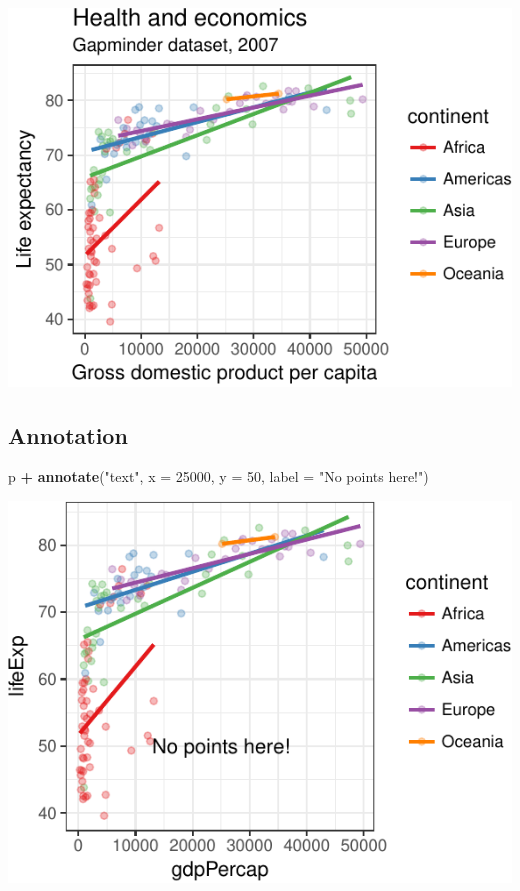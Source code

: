 \documentclass[12pt,]{krantz}
\makeatletter
\newenvironment{Shaded}{\begin{snugshade}}{\end{snugshade}}
\newcommand{\DataTypeTok}[1]{\textcolor[rgb]{0.13,0.29,0.53}{#1}}
\newcommand{\DecValTok}[1]{\textcolor[rgb]{0.00,0.00,0.81}{#1}}
\newcommand{\KeywordTok}[1]{\textcolor[rgb]{0.13,0.29,0.53}{\textbf{#1}}}
\newcommand{\NormalTok}[1]{#1}
\newcommand{\OperatorTok}[1]{\textcolor[rgb]{0.81,0.36,0.00}{\textbf{#1}}}
\newcommand{\StringTok}[1]{\textcolor[rgb]{0.31,0.60,0.02}{#1}}
\newenvironment{kframe}{%
\medskip{}
\setlength{\fboxsep}{.8em}
 \def\at@end@of@kframe{}%
 \ifinner\ifhmode%
  \def\at@end@of@kframe{\end{minipage}}%
  \begin{minipage}{\columnwidth}%
 \fi\fi%
 \def\FrameCommand##1{\hskip\@totalleftmargin \hskip-\fboxsep
 \colorbox{shadecolor}{##1}\hskip-\fboxsep
     \hskip-\linewidth \hskip-\@totalleftmargin \hskip\columnwidth}%
 \MakeFramed {\advance\hsize-\width
   \@totalleftmargin\z@ \linewidth\hsize
   \@setminipage}}%
 {\par\unskip\endMakeFramed%
 \at@end@of@kframe}
\renewenvironment{Shaded}{\begin{kframe}}{\end{kframe}}
\theoremstyle{definition}
\theoremstyle{definition}
\theoremstyle{definition}
\theoremstyle{remark}
\makeatother
\begin{document}
\includegraphics{05_fine_tuning_plots_files/figure-latex/unnamed-chunk-14-1.pdf}

\hypertarget{annotation}{%
\subsection{Annotation}\label{annotation}}

\begin{Shaded}
\begin{Highlighting}[]
\NormalTok{p }\OperatorTok{+}
\StringTok{  }\KeywordTok{annotate}\NormalTok{(}\StringTok{"text"}\NormalTok{,}
           \DataTypeTok{x =} \DecValTok{25000}\NormalTok{,}
           \DataTypeTok{y =} \DecValTok{50}\NormalTok{,}
           \DataTypeTok{label =} \StringTok{"No points here!"}\NormalTok{)}
\end{Highlighting}
\end{Shaded}

\includegraphics{05_fine_tuning_plots_files/figure-latex/unnamed-chunk-15-1.pdf}
\end{document}
